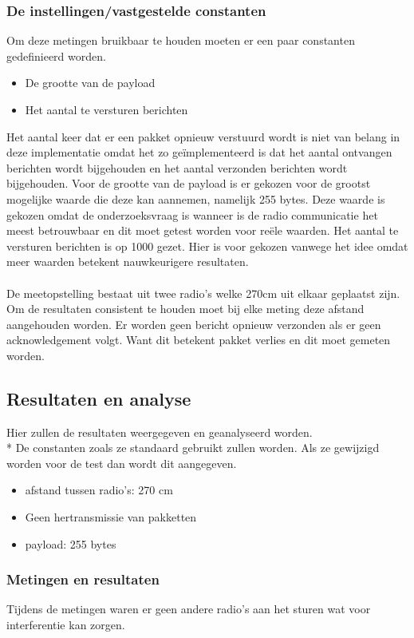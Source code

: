 \documentclass{article}
\begin{document}
\subsubsection{De instellingen/vastgestelde constanten}
Om deze metingen bruikbaar te houden moeten er een paar constanten gedefinieerd worden.
\begin{itemize}
	\item De grootte van de payload
	\item Het aantal te versturen berichten
\end{itemize}
Het aantal keer dat er een pakket opnieuw verstuurd wordt is niet van belang in deze implementatie omdat het zo ge\"{i}mplementeerd is dat het aantal ontvangen berichten wordt bijgehouden en het aantal verzonden berichten wordt bijgehouden. 
Voor de grootte van de payload is er gekozen voor de grootst mogelijke waarde die deze kan aannemen, namelijk 255 bytes. Deze waarde is gekozen omdat de onderzoeksvraag is wanneer is de radio communicatie het meest betrouwbaar en dit moet getest worden voor re\"{e}le waarden. 
Het aantal te versturen berichten is op 1000 gezet. Hier is voor gekozen vanwege het idee omdat meer waarden betekent nauwkeurigere resultaten.
\\
\\
De meetopstelling bestaat uit twee radio's welke 270cm uit elkaar geplaatst zijn. Om de resultaten consistent te houden moet bij elke meting deze afstand aangehouden worden. 
Er worden geen bericht opnieuw verzonden als er geen acknowledgement volgt. Want dit betekent pakket verlies en dit moet gemeten worden. 

\subsection{Resultaten en analyse}
Hier zullen de resultaten weergegeven en geanalyseerd worden. \\*
  De constanten zoals ze standaard gebruikt zullen worden. Als ze gewijzigd worden voor de test dan wordt dit aangegeven. 
  \begin{itemize}
  	\item afstand tussen radio's: 270 cm
  	\item Geen hertransmissie van pakketten
  	\item payload: 255 bytes
  \end{itemize}
  
\subsubsection{Metingen en resultaten}
Tijdens de metingen waren er geen andere radio's aan het sturen wat voor interferentie kan zorgen.\\
\end{document}
